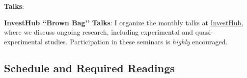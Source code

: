 \documentclass[letterpaper]{article}
\renewenvironment{itemize}{
  \begin{list}{}{
    \setlength{\leftmargin}{1.5em}
  }
}{
  \end{list}
}
\begin{document}
\begin{itemize}
\begin{itemize}
    \end{itemize} 


\item {\bf Talks}:

  \begin{itemize}
    \item[$\diamond$] {\bf InvestHub ``Brown Bag’’ Talks}: I organize the monthly talks at \href{https://invest.utu.fi/welfare-research-and-ecosystem/investhub/}{InvestHub}, where we discuss ongoing research, including experimental and quasi-experimental studies. Participation in these seminars is \emph{highly} encouraged.
  \end{itemize}

\end{itemize}













\subsection*{Schedule and Required Readings}
\end{document}
